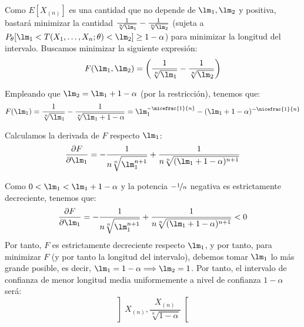 \begin{ejercicio}
    Como $E[X_{(n)}]$ es una cantidad que no depende de $\lm_1,\lm_2$ y positiva, bastará minimizar la cantidad $\frac{1}{\sqrt[n]{\lm_1}} - \frac{1}{\sqrt[n]{\lm_2}}$ (sujeta a $P_\theta[\lm_1<T(X_1, \ldots, X_n;\theta)<\lm_2]\geq 1-\alpha$) para minimizar la longitud del intervalo. Buscamos minimizar la siguiente expresión:
    \begin{equation*}
        F(\lm_1,\lm_2) = \left(\frac{1}{\sqrt[n]{\lm_1}} - \frac{1}{\sqrt[n]{\lm_2}}\right)
    \end{equation*}

    Empleando que $\lm_2=\lm_1 + 1-\alpha$ (por la restricción), tenemos que:
    \begin{equation*}
        F(\lm_1) = \frac{1}{\sqrt[n]{\lm_1}} - \frac{1}{\sqrt[n]{\lm_1 + 1-\alpha}}
        = \lm_1^{-\nicefrac{1}{n}} - (\lm_1 + 1-\alpha)^{-\nicefrac{1}{n}}
    \end{equation*}

    Calculamos la derivada de $F$ respecto $\lm_1$:
    \begin{equation*}
        \frac{\partial F}{\partial \lm_1} = -\frac{1}{n\sqrt[n]{\lm_1^{n+1}}} + \frac{1}{n\sqrt[n]{(\lm_1 + 1-\alpha)^{n+1}}}
    \end{equation*}

    Como $0<\lm_1<\lm_1 + 1-\alpha$ y la potencia $-\nicefrac{1}{n}$ negativa es estrictamente decreciente, tenemos que:
    \begin{equation*}
        \frac{\partial F}{\partial \lm_1} = -\frac{1}{n\sqrt[n]{\lm_1^{n+1}}} + \frac{1}{n\sqrt[n]{(\lm_1 + 1-\alpha)^{n+1}}} < 0
    \end{equation*}
    Por tanto, $F$ es estrictamente decreciente respecto $\lm_1$, y por tanto, para minimizar $F$ (y por tanto la longitud del intervalo), debemos tomar $\lm_1$ lo más grande posible, es decir, $\lm_1 = 1-\alpha \Longrightarrow \lm_2 = 1$. Por tanto, el intervalo de confianza de menor longitud media uniformemente a nivel de confianza $1-\alpha$ será:
    \begin{equation*}
        \left]X_{(n)},\frac{X_{(n)}}{\sqrt[n]{1-\alpha}}\right[
    \end{equation*}
\end{ejercicio}

